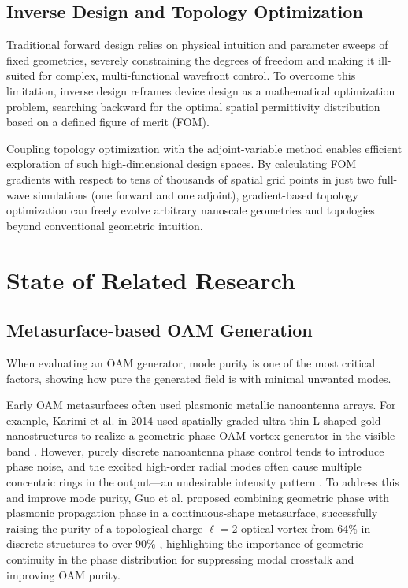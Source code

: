 \subsection{Inverse Design and Topology Optimization}

Traditional forward design relies on physical intuition and parameter sweeps of fixed geometries, severely constraining the degrees of freedom and making it ill-suited for complex, multi-functional wavefront control. To overcome this limitation, inverse design reframes device design as a mathematical optimization problem, searching backward for the optimal spatial permittivity distribution based on a defined figure of merit (FOM).

Coupling topology optimization with the adjoint-variable method enables efficient exploration of such high-dimensional design spaces. By calculating FOM gradients with respect to tens of thousands of spatial grid points in just two full-wave simulations (one forward and one adjoint), gradient-based topology optimization can freely evolve arbitrary nanoscale geometries and topologies beyond conventional geometric intuition.

\section{State of Related Research}

\subsection{Metasurface-based OAM Generation}

When evaluating an OAM generator, mode purity is one of the most critical factors, showing how pure the generated field is with minimal unwanted modes.

Early OAM metasurfaces often used plasmonic metallic nanoantenna arrays. For example, Karimi et al. in 2014 used spatially graded ultra-thin L-shaped gold nanostructures to realize a geometric-phase OAM vortex generator in the visible band \cite{karimi2014generating}. However, purely discrete nanoantenna phase control tends to introduce phase noise, and the excited high-order radial modes often cause multiple concentric rings in the output—an undesirable intensity pattern \cite{karimi2014generating}. To address this and improve mode purity, Guo et al. proposed combining geometric phase with plasmonic propagation phase in a continuous-shape metasurface, successfully raising the purity of a topological charge $\ell = 2$ optical vortex from 64\% in discrete structures to over 90\% \cite{guo2016merging}, highlighting the importance of geometric continuity in the phase distribution for suppressing modal crosstalk and improving OAM purity.

